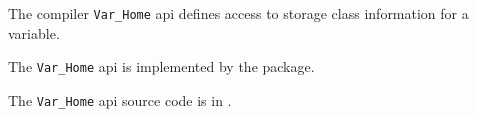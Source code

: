 The compiler {\tt Var\_Home} api defines access to storage class information for a 
variable.

The {\tt Var\_Home} api is implemented by the  package.

The {\tt Var\_Home} api source code is in .





